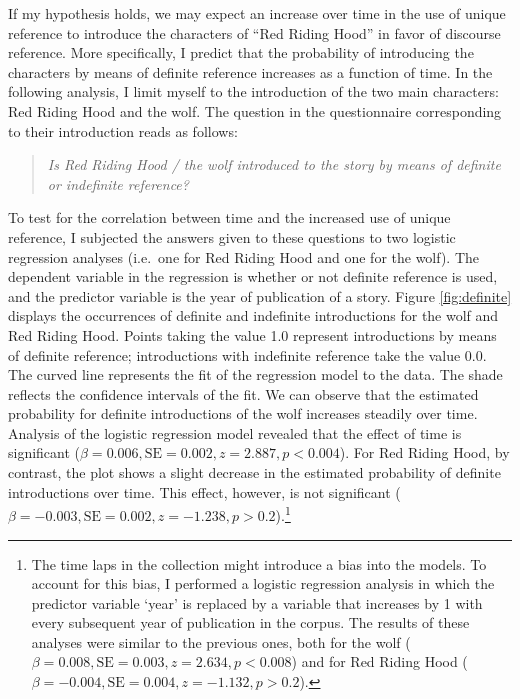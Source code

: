 If my hypothesis holds, we may expect an increase over time in the use of unique reference to introduce the characters of ``Red Riding Hood'' in favor of discourse reference. More specifically, I predict that the probability of introducing the characters by means of definite reference increases as a function of time. In the following analysis, I limit myself to the introduction of the two main characters: Red Riding Hood and the wolf. The question in the questionnaire corresponding to their introduction reads as follows: 
\begin{quotation}
\noindent\emph{Is Red Riding Hood / the wolf introduced to the story by means of definite or indefinite reference?} 
\end{quotation}
To test for the correlation between time and the increased use of unique reference, I subjected the answers given to these questions to two logistic regression analyses (i.e.\ one for Red Riding Hood and one for the wolf). The dependent variable in the regression is whether or not definite reference is used, and the predictor variable is the year of publication of a story. Figure \ref{fig:definite} displays the occurrences of definite and indefinite introductions for the wolf and Red Riding Hood. Points taking the value 1.0 represent introductions by means of definite reference; introductions with indefinite reference take the value 0.0. The curved line represents the fit of the regression model to the data. The shade reflects the confidence intervals of the fit. We can observe that the estimated probability for definite introductions of the wolf increases steadily over time. Analysis of the logistic regression model revealed that the effect of time is significant ($\beta=0.006, \textrm{SE} = 0.002, z = 2.887, p < 0.004$). For Red Riding Hood, by contrast, the plot shows a slight decrease in the estimated probability of definite introductions over time. This effect, however, is not significant ($\beta=-0.003, \textrm{SE}=0.002, z=-1.238, p > 0.2$).\footnote{The time laps in the collection might introduce a bias into the models. To account for this bias, I performed a logistic regression analysis in which the predictor variable `year' is replaced by a variable that increases by 1 with every subsequent year of publication in the corpus. The results of these analyses were similar to the previous ones, both for the wolf ($\beta=0.008, \textrm{SE} = 0.003, z = 2.634, p < 0.008$) and for Red Riding Hood ($\beta=-0.004, \textrm{SE} = 0.004, z = -1.132, p > 0.2$).}

